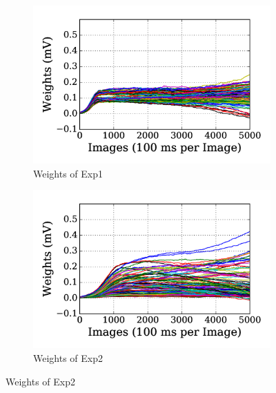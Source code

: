 \begin{figure}
	\centering
	\DIFdelbeginFL %
\DIFdelendFL \DIFaddbeginFL \begin{subfigure}[t]{0.48\textwidth}
		\DIFaddendFL \includegraphics[width=\textwidth]{pics_sdlm/00_exp_SAE_Orig/exp1_weights_s.png}
		\caption{Weights of Exp1}
	\end{subfigure}
	\DIFdelbeginFL %
\DIFdelendFL \DIFaddbeginFL \begin{subfigure}[t]{0.48\textwidth}
		\DIFaddendFL \includegraphics[width=\textwidth]{pics_sdlm/00_exp_SAE_Orig/exp2_weights_s.png}
		\caption{Weights of Exp2}
	\end{subfigure}
	\DIFdelbeginFL %

\end{figure}
